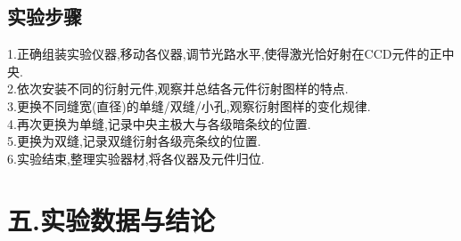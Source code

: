 \documentclass[12pt,a4paper,oneside]{ctexart}
\begin{document}
\subsection*{实验步骤} \noindent
1.正确组装实验仪器,移动各仪器,调节光路水平,使得激光恰好射在CCD元件的正中央.\\
2.依次安装不同的衍射元件,观察并总结各元件衍射图样的特点.\\
3.更换不同缝宽(直径)的单缝/双缝/小孔,观察衍射图样的变化规律.\\
4.再次更换为单缝,记录中央主极大与各级暗条纹的位置.\\
5.更换为双缝,记录双缝衍射各级亮条纹的位置.\\
6.实验结束,整理实验器材,将各仪器及元件归位.\\
\section{五.实验数据与结论}
\end{document}
